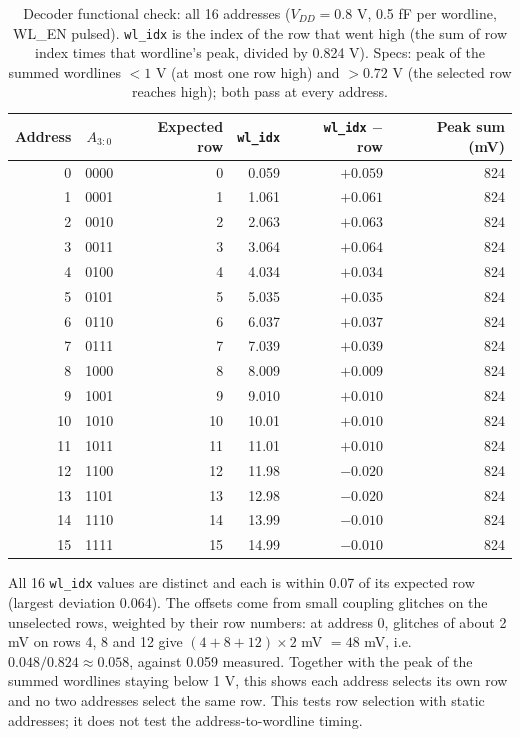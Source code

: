 \documentclass[10pt,letterpaper]{article}
\newcommand{\code}[1]{\texttt{#1}}
\begin{document}
\begin{table}[H]\centering\small
\caption{Decoder functional check: all 16 addresses ($V_{DD}=0.8$ V, 0.5 fF per wordline, WL\_EN pulsed). \code{wl\_idx} is the index of the row that went high (the sum of row index times that wordline's peak, divided by 0.824 V). Specs: peak of the summed wordlines $<1$ V (at most one row high) and $>0.72$ V (the selected row reaches high); both pass at every address.}
\begin{tabular}{@{}rcrrrr@{}}\toprule Address & $A_{3:0}$ & Expected row & \code{wl\_idx} & \code{wl\_idx} $-$ row & Peak sum (mV)\\\midrule
0 & 0000 & 0 & 0.059 & $+0.059$ & 824 \\
1 & 0001 & 1 & 1.061 & $+0.061$ & 824 \\
2 & 0010 & 2 & 2.063 & $+0.063$ & 824 \\
3 & 0011 & 3 & 3.064 & $+0.064$ & 824 \\
4 & 0100 & 4 & 4.034 & $+0.034$ & 824 \\
5 & 0101 & 5 & 5.035 & $+0.035$ & 824 \\
6 & 0110 & 6 & 6.037 & $+0.037$ & 824 \\
7 & 0111 & 7 & 7.039 & $+0.039$ & 824 \\
8 & 1000 & 8 & 8.009 & $+0.009$ & 824 \\
9 & 1001 & 9 & 9.010 & $+0.010$ & 824 \\
10 & 1010 & 10 & 10.01 & $+0.010$ & 824 \\
11 & 1011 & 11 & 11.01 & $+0.010$ & 824 \\
12 & 1100 & 12 & 11.98 & $-0.020$ & 824 \\
13 & 1101 & 13 & 12.98 & $-0.020$ & 824 \\
14 & 1110 & 14 & 13.99 & $-0.010$ & 824 \\
15 & 1111 & 15 & 14.99 & $-0.010$ & 824 \\
\bottomrule\end{tabular}\end{table}
All 16 \code{wl\_idx} values are distinct and each is within 0.07 of its expected row (largest deviation 0.064). The offsets come from small coupling glitches on the unselected rows, weighted by their row numbers: at address 0, glitches of about 2 mV on rows 4, 8 and 12 give $(4+8+12)\times2$ mV $=48$ mV, i.e.\ $0.048/0.824\approx0.058$, against 0.059 measured. Together with the peak of the summed wordlines staying below 1 V, this shows each address selects its own row and no two addresses select the same row. This tests row selection with static addresses; it does not test the address-to-wordline timing.
\end{document}
